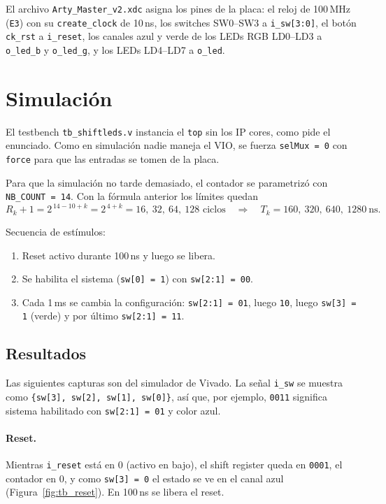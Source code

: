 \documentclass[11pt,a4paper]{scrartcl}
\newcommand{\sig}[1]{\texttt{#1}}
\begin{document}
	El archivo \sig{Arty\_Master\_v2.xdc} asigna los pines de la placa: el reloj de 100\,MHz
	(\sig{E3}) con su \sig{create\_clock} de 10\,ns, los switches SW0--SW3 a \sig{i\_sw[3:0]},
	el botón \sig{ck\_rst} a \sig{i\_reset}, los canales azul y verde de los LEDs RGB
	LD0--LD3 a \sig{o\_led\_b} y \sig{o\_led\_g}, y los LEDs LD4--LD7 a \sig{o\_led}.

	\section{Simulación}

	El testbench \sig{tb\_shiftleds.v} instancia el \sig{top} sin los IP cores, como pide el
	enunciado. Como en simulación nadie maneja el VIO, se fuerza
	\sig{selMux = 0} con \sig{force} para que las entradas se tomen de la placa.

	Para que la simulación no tarde demasiado, el contador se parametrizó con
	\sig{NB\_COUNT = 14}. Con la fórmula anterior los límites quedan
	\[
		R_k + 1 = 2^{\,14-10+k} = 2^{\,4+k} = 16,\ 32,\ 64,\ 128 \text{ ciclos}
		\quad\Rightarrow\quad T_k = 160,\ 320,\ 640,\ 1280\ \text{ns} .
	\]

	Secuencia de estímulos:

	\begin{enumerate}
		\item Reset activo durante 100\,ns y luego se libera.
		\item Se habilita el sistema (\sig{sw[0] = 1}) con \sig{sw[2:1] = 00}.
		\item Cada 1\,ms se cambia la configuración: \sig{sw[2:1] = 01}, luego \sig{10}, luego
		\sig{sw[3] = 1} (verde) y por último \sig{sw[2:1] = 11}.
	\end{enumerate}

	\subsection{Resultados}

	Las siguientes capturas son del simulador de Vivado. La señal \sig{i\_sw} se muestra
	como \sig{\{sw[3], sw[2], sw[1], sw[0]\}}, así que, por ejemplo, \sig{0011} significa
	sistema habilitado con \sig{sw[2:1] = 01} y color azul.

	\paragraph{Reset.} Mientras \sig{i\_reset} está en 0 (activo en bajo), el shift register
	queda en \sig{0001}, el contador en 0, y como \sig{sw[3] = 0} el estado se ve en el canal
	azul (Figura~\ref{fig:tb_reset}). En 100\,ns se libera el reset.
\end{document}
